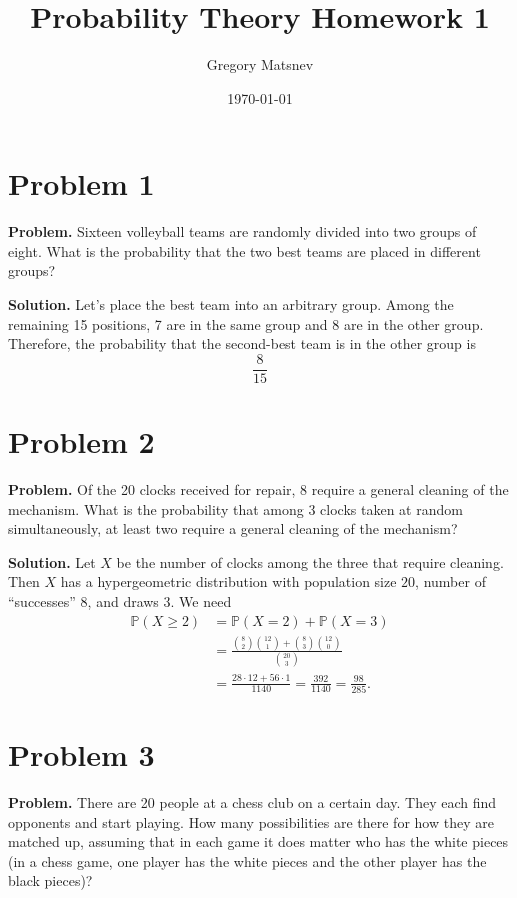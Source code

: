 \documentclass{article}
\title{Probability Theory Homework 1}
\author{Gregory Matsnev}
\date{\today}
\begin{document}
\maketitle

\section{Problem 1}

\textbf{Problem.} Sixteen volleyball teams are randomly divided into two groups of eight. What is the probability that the two best teams are placed in different groups?

\textbf{Solution.} Let's place the best team into an arbitrary group. Among the remaining 15 positions, 7 are in the same group and 8 are in the other group. Therefore, the probability that the second-best team is in the other group is
\[
\frac{8}{15}
\]
\section{Problem 2}

\textbf{Problem.} Of the 20 clocks received for repair, 8 require a general cleaning of the mechanism. What is the probability that among 3 clocks taken at random simultaneously, at least two require a general cleaning of the mechanism?

\textbf{Solution.} Let $X$ be the number of clocks among the three that require cleaning. Then $X$ has a hypergeometric distribution with population size $20$, number of ``successes'' $8$, and draws $3$. We need
\begin{align*}
\mathbb{P}(X \ge 2) &= \mathbb{P}(X=2) + \mathbb{P}(X=3) \\
&= \frac{\binom{8}{2}\binom{12}{1} + \binom{8}{3}\binom{12}{0}}{\binom{20}{3}} \\
&= \frac{28\cdot 12 + 56\cdot 1}{1140} = \frac{392}{1140} = \frac{98}{285}.
\end{align*}
\section{Problem 3}

\textbf{Problem.} There are 20 people at a chess club on a certain day. They each find opponents and start playing. How many possibilities are there for how they are matched up, assuming that in each game it does matter who has the white pieces (in a chess game, one player has the white pieces and the other player has the black pieces)?
\end{document}
